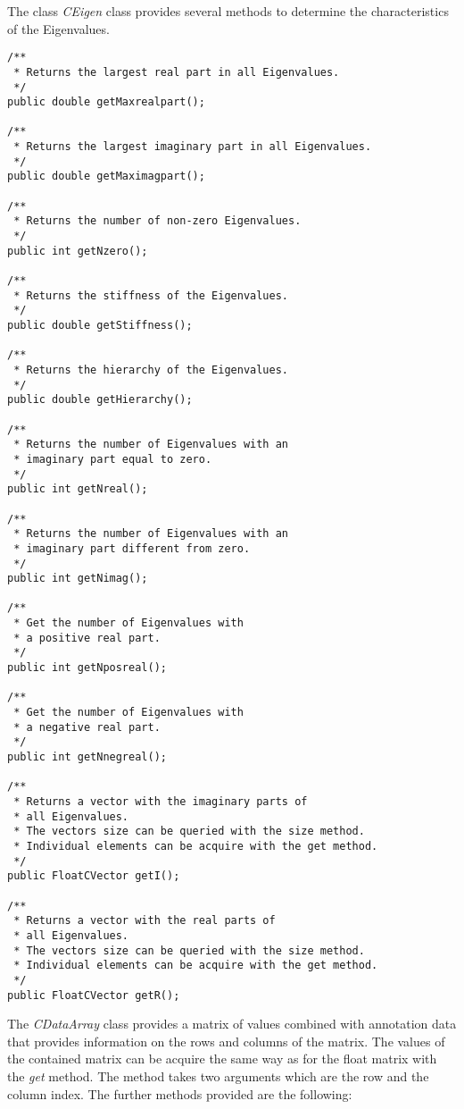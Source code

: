 \documentclass[a4,10pt]{article}
\begin{document}
The class \textit{CEigen} class provides several methods to determine the characteristics of the Eigenvalues.

\begin{lstlisting}
/**
 * Returns the largest real part in all Eigenvalues.
 */
public double getMaxrealpart();

/**
 * Returns the largest imaginary part in all Eigenvalues.
 */
public double getMaximagpart();

/**
 * Returns the number of non-zero Eigenvalues.
 */
public int getNzero();

/**
 * Returns the stiffness of the Eigenvalues.
 */
public double getStiffness();

/**
 * Returns the hierarchy of the Eigenvalues.
 */
public double getHierarchy();

/**
 * Returns the number of Eigenvalues with an
 * imaginary part equal to zero.
 */
public int getNreal();

/**
 * Returns the number of Eigenvalues with an
 * imaginary part different from zero.
 */
public int getNimag();

/**
 * Get the number of Eigenvalues with
 * a positive real part.
 */
public int getNposreal();

/**
 * Get the number of Eigenvalues with
 * a negative real part.
 */
public int getNnegreal();

/**
 * Returns a vector with the imaginary parts of
 * all Eigenvalues.
 * The vectors size can be queried with the size method.
 * Individual elements can be acquire with the get method.
 */
public FloatCVector getI();

/**
 * Returns a vector with the real parts of
 * all Eigenvalues.
 * The vectors size can be queried with the size method.
 * Individual elements can be acquire with the get method.
 */
public FloatCVector getR();
\end{lstlisting}

The \textit{CDataArray} class provides a matrix of values combined with annotation data that provides information on the rows and columns of the matrix.
The values of the contained matrix can be acquire the same way as for the float matrix with the \textit{get} method. The method takes two arguments which are the row and the column index.
The further methods provided are the following:
\end{document}
